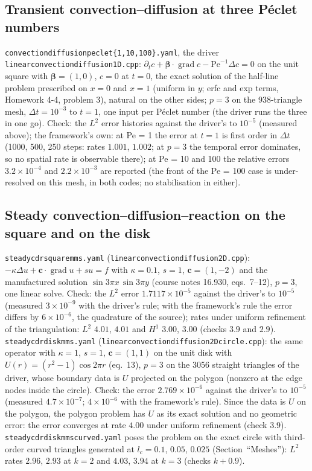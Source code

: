 \documentclass[11pt]{article}
\newcommand{\grad}{\operatorname{grad}}
\DeclareRobustCommand{\file}[1]{{\def\_{\textunderscore\allowbreak}\texttt{#1}}}
\begin{document}
\subsection{Transient convection--diffusion at three P\'eclet numbers}
\file{convection\_diffusion\_peclet\_\{1,10,100\}.yaml}, the driver
\file{linear\_convection\_diffusion\_1D.cpp}: $\partial_t c + \bm\beta\cdot\grad c - \mathrm{Pe}^{-1}\Delta c = 0$
on the unit square with $\bm\beta = (1, 0)$, $c = 0$ at $t = 0$, the exact
solution of the half-line problem prescribed on $x = 0$ and $x = 1$
(uniform in $y$; erfc and exp terms, Homework 4-4, problem 3), natural on
the other sides; $p = 3$ on the 938-triangle mesh, $\Delta t = 10^{-3}$ to
$t = 1$, one input per P\'eclet number (the driver runs the three in one
go).  Check: the $L^2$ error histories against the driver's to $10^{-5}$
(measured above); the framework's own: at Pe = 1 the error at $t = 1$ is
first order in $\Delta t$ (1000, 500, 250 steps: rates $1.001$, $1.002$; at
$p = 3$ the temporal error dominates, so no spatial rate is observable
there); at Pe = 10 and 100 the relative errors $3.2\times10^{-4}$ and
$2.2\times10^{-3}$ are reported (the front of the Pe = 100 case is
under-resolved on this mesh, in both codes; no stabilisation in either).

\subsection{Steady convection--diffusion--reaction on the square and on the disk}
\file{steady\_cdr\_square\_mms.yaml} (\file{linear\_convection\_diffusion\_2D.cpp}):
$-\kappa\Delta u + \bm c\cdot\grad u + s u = f$ with $\kappa = 0.1$, $s = 1$,
$\bm c = (1, -2)$ and the manufactured solution $\sin 3\pi x\,\sin 3\pi y$
(course notes 16.930, eqs.\ 7--12), $p = 3$, one linear solve.  Check: the
$L^2$ error $1.7117\times10^{-5}$ against the driver's to $10^{-5}$
(measured $3\times10^{-9}$ with the driver's rule; with the framework's
rule the error differs by $6\times10^{-6}$, the quadrature of the source);
rates under uniform refinement of the triangulation: $L^2$ $4.01$, $4.01$
and $H^1$ $3.00$, $3.00$ (checks $3.9$ and $2.9$).
\file{steady\_cdr\_disk\_mms.yaml} (\file{linear\_convection\_diffusion\_2D\_circle.cpp}):
the same operator with $\kappa = 1$, $s = 1$, $\bm c = (1, 1)$ on the unit
disk with $U(r) = (r^2 - 1)\cos 2\pi r$ (eq.\ 13), $p = 3$ on the 3056
straight triangles of the driver, whose boundary data is $U$ projected on
the polygon (nonzero at the edge nodes inside the circle).  Check: the
error $2.769\times10^{-6}$ against the driver's to $10^{-5}$ (measured
$4.7\times10^{-7}$; $4\times10^{-6}$ with the framework's rule).  Since the
data is $U$ on the polygon, the polygon problem has $U$ as its exact
solution and no geometric error: the error converges at rate $4.00$ under
uniform refinement (check $3.9$).  \file{steady\_cdr\_disk\_mms\_curved.yaml}
poses the problem on the exact circle with third-order curved triangles
generated at $l_c = 0.1$, $0.05$, $0.025$ (Section~``Meshes''): $L^2$ rates
$2.96$, $2.93$ at $k = 2$ and $4.03$, $3.94$ at $k = 3$ (checks $k + 0.9$).
\end{document}
